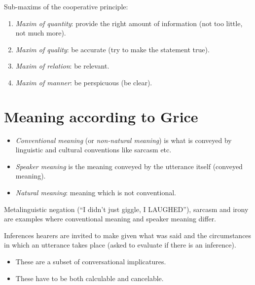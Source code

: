Sub-maxims of the cooperative principle:
\begin{enumerate}[label=\roman*.]
  \item \emph{Maxim of quantity}: provide the right amount of information (not too little, not much more).
  \item \emph{Maxim of quality}: be accurate (try to make the statement true).
  \item \emph{Maxim of relation}: be relevant.
  \item \emph{Maxim of manner}: be perspicuous (be clear).
\end{enumerate}

\section{Meaning according to Grice}

\begin{definition}\leavevmode
\begin{itemize}
  \item \emph{Conventional meaning} (or \emph{non-natural meaning}) is what is conveyed by linguistic and cultural conventions like sarcasm etc.
  \item \emph{Speaker meaning} is the meaning conveyed by the utterance itself (conveyed meaning).
  \item \emph{Natural meaning}: meaning which is not conventional.
\end{itemize}
\end{definition}

Metalinguistic negation (``I didn't just giggle, I LAUGHED''), sarcasm and irony are examples where conventional meaning and speaker meaning differ.

\begin{definition}
Inferences hearers are invited to make given what was said and the circumstances in which an utterance takes place (asked to evaluate if there is an inference).
\begin{itemize}
  \item These are a subset of conversational implicatures.
  \item These have to be both calculable and cancelable.
\end{itemize}
\end{definition}

